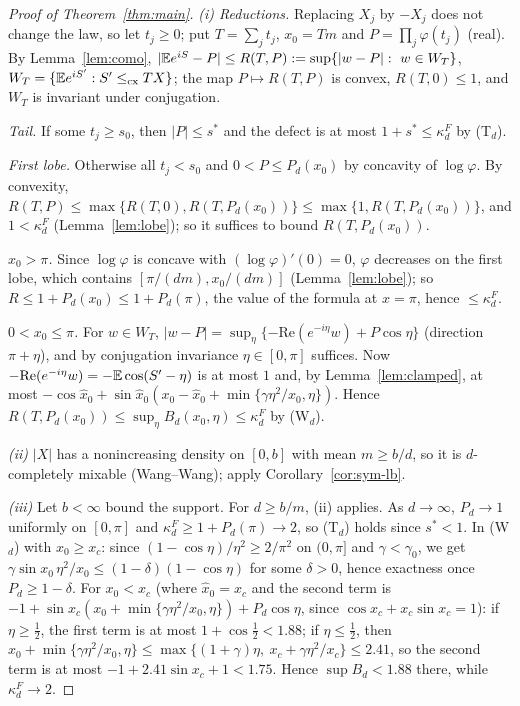 \documentclass[11pt]{amsart}
\theoremstyle{definition}\newtheorem{definition}[theorem]{Definition}\theoremstyle{remark}\newtheorem{remark}[theorem]{Remark}
\begin{document}
\begin{proof}[Proof of Theorem~\ref{thm:main}]\emph{(i) Reductions.} Replacing $X_j$ by $-X_j$ does not change the law, so let $t_j\ge0$; put $T=\sum_jt_j$, $x_0=Tm$ and
$P=\prod_j\varphi(t_j)$ (real). By Lemma~\ref{lem:como}, $|\mathbb E e^{iS}-P|\le R(T,P):=\sup\{|w-P|:\ w\in W_T\}$, $W_T=\{\mathbb E e^{iS'}:S'\le_{\mathrm{cx}} TX\}$; the map $P\mapsto R(T,P)$ is convex,
$R(T,0)\le1$, and $W_T$ is invariant under conjugation.

\emph{Tail.} If some $t_j\ge s_0$, then $|P|\le s^*$ and the defect is at most $1+s^*\le\kappa_d^F$ by (T$_d$).

\emph{First lobe.} Otherwise all $t_j<s_0$ and $0<P\le P_d(x_0)$ by concavity of $\log\varphi$. By convexity, $R(T,P)\le\max\{R(T,0),R(T,P_d(x_0))\}\le\max\{1,R(T,P_d(x_0))\}$,
and $1<\kappa_d^F$ (Lemma~\ref{lem:lobe}); so it suffices to bound $R(T,P_d(x_0))$.

\emph{$x_0>\pi$.} Since $\log\varphi$ is concave with $(\log\varphi)'(0)=0$, $\varphi$ decreases on the first lobe, which contains $[\pi/(dm),x_0/(dm)]$ (Lemma~\ref{lem:lobe}); so $R\le1+P_d(x_0)\le1+P_d(\pi)$, the value of the formula at $x=\pi$, hence $\le\kappa_d^F$.

\emph{$0<x_0\le\pi$.} For $w\in W_T$, $|w-P|=\sup_\eta\{-\mathrm{Re}(e^{-i\eta}w)+P\cos\eta\}$ (direction $\pi+\eta$), and by conjugation invariance $\eta\in[0,\pi]$ suffices. Now
$-\mathrm{Re}(e^{-i\eta}w)=-\mathbb E\cos(S'-\eta)$ is at most $1$ and, by Lemma~\ref{lem:clamped}, at most $-\cos\hat x_0+\sin\hat x_0(x_0-\hat x_0+\min\{\gamma\eta^2/x_0,\eta\})$. Hence
$R(T,P_d(x_0))\le\sup_\eta B_d(x_0,\eta)\le\kappa_d^F$ by (W$_d$).

\emph{(ii)} $|X|$ has a nonincreasing density on $[0,b]$ with mean $m\ge b/d$, so it is $d$-completely mixable (Wang--Wang); apply Corollary~\ref{cor:sym-lb}.

\emph{(iii)} Let $b<\infty$ bound the support. For $d\ge b/m$, (ii) applies. As $d\to\infty$, $P_d\to1$ uniformly on $[0,\pi]$ and $\kappa_d^F\ge1+P_d(\pi)\to2$, so (T$_d$) holds
since $s^*<1$. In (W$_d$) with $x_0\ge x_c$: since $(1-\cos\eta)/\eta^2\ge2/\pi^2$ on $(0,\pi]$ and $\gamma<\gamma_0$, we get $\gamma\sin x_0\,\eta^2/x_0\le(1-\delta)(1-\cos\eta)$ for some
$\delta>0$, hence exactness once $P_d\ge1-\delta$. For $x_0<x_c$ (where $\hat x_0=x_c$ and the second term is $-1+\sin x_c(x_0+\min\{\gamma\eta^2/x_0,\eta\})+P_d\cos\eta$, since $\cos x_c+x_c\sin x_c=1$):
if $\eta\ge\frac12$, the first term is at most $1+\cos\frac12<1.88$; if $\eta\le\frac12$, then $x_0+\min\{\gamma\eta^2/x_0,\eta\}\le\max\{(1+\gamma)\eta,\ x_c+\gamma\eta^2/x_c\}\le2.41$,
so the second term is at most $-1+2.41\sin x_c+1<1.75$. Hence $\sup B_d<1.88$ there, while $\kappa_d^F\to2$.\end{proof}
\end{document}
